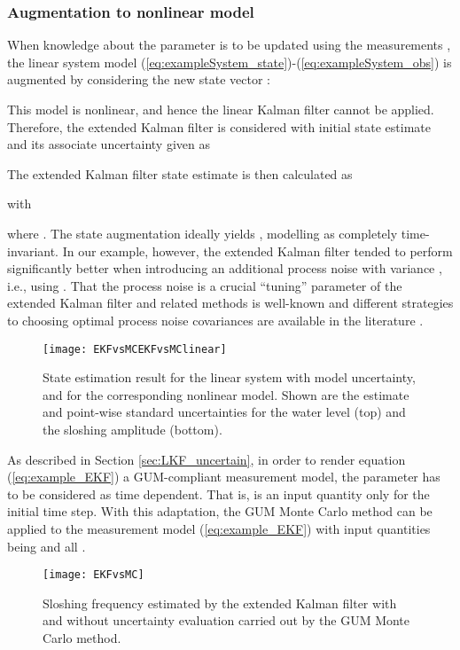 \documentclass[10pt]{article}
\begin{document}
\begin{spacing}{1}
\subsubsection*{Augmentation to nonlinear model}
When knowledge about the parameter  is to be updated using the measurements , the linear system model (\ref{eq:exampleSystem_state})-(\ref{eq:exampleSystem_obs}) is augmented by considering the new state vector :

This model is nonlinear, and hence the linear Kalman filter cannot be applied. Therefore, the extended Kalman filter is considered
with initial state estimate and its associate uncertainty given as


The extended Kalman filter state estimate is then calculated as

with

where . The state augmentation ideally yields , modelling  as completely time-invariant. In our example, however, the extended Kalman filter tended to perform significantly better when introducing an additional process noise
with variance , i.e., using . That the process noise is a crucial ``tuning'' parameter of the extended Kalman filter and related methods is well-known and different strategies to choosing optimal process noise covariances are available in the literature \cite{Bavdekar:2011it, Chatzi:2009jp}.

\begin{figure}[h!]	
	\centering
	\texttt{[image: EKFvsMCEKFvsMClinear]}
	\caption{State estimation result for the linear system with model uncertainty, and for the corresponding nonlinear model. Shown are the estimate and point-wise standard uncertainties for the water level (top) and the sloshing amplitude (bottom).}
	\label{fig:LKF_uncertainmodel}
\end{figure}
 
As described in Section \ref{sec:LKF_uncertain}, in order to render equation (\ref{eq:example_EKF}) a GUM-compliant measurement model, the parameter  has to be considered as time dependent. That is,  is an input quantity only for the initial time step. With this adaptation, the GUM Monte Carlo method can be applied to the measurement model (\ref{eq:example_EKF}) with input quantities being 
 and all .

\begin{figure}[h!]
	\centering
	\texttt{[image: EKFvsMC]}
	\caption{Sloshing frequency estimated by the extended Kalman filter with and without uncertainty evaluation carried out by the GUM Monte Carlo method.}
	\label{fig:EKFvsMCEKF}
\end{figure}


\end{spacing}
\end{document}

